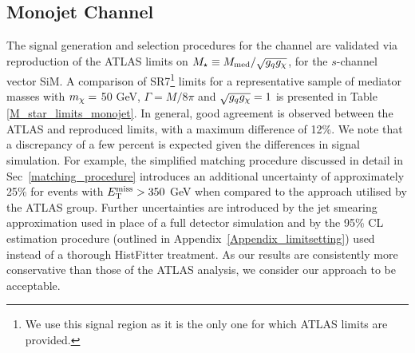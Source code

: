 \subsection{Monojet Channel}
\label{monojet_validation}
The signal generation and selection procedures for the \monojet channel are validated via reproduction of the ATLAS limits on $M_{\star} \equiv M_{\mathrm{med}} / \sqrt{g_q g_{\chi}}$, for the $s$-channel vector SiM. A comparison of SR7\footnote{We use this signal region as it is the only one for which ATLAS limits are provided.} limits for a representative sample of mediator masses with $m_{\chi} = $ 50 GeV, $\Gamma = M/8\pi$ and $\sqrt{g_q g_{\chi}} = 1$ is presented in Table \ref{M_star_limits_monojet}. In general, good agreement is observed between the ATLAS and reproduced limits, with a maximum difference of 12\%. We note that a discrepancy of a few percent is expected given the differences in signal simulation. For example, the simplified matching procedure discussed in detail in Sec~\ref{matching_procedure} introduces an additional uncertainty of approximately 25\% for events with $E_{\mathrm{T}}^{\mathrm{miss}} > 350$ GeV when compared to the approach utilised by the ATLAS \monojet group. Further uncertainties are introduced by the jet smearing approximation used in place of a full detector simulation and by the 95\% CL estimation procedure (outlined in Appendix~\ref{Appendix_limitsetting}) used instead of a thorough HistFitter treatment. As our results are consistently more conservative than those of the ATLAS analysis, we consider our approach to be acceptable.
%
%
